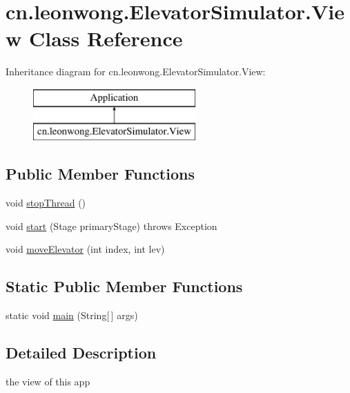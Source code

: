 \hypertarget{classcn_1_1leonwong_1_1_elevator_simulator_1_1_view}{}\section{cn.\+leonwong.\+Elevator\+Simulator.\+View Class Reference}
\label{classcn_1_1leonwong_1_1_elevator_simulator_1_1_view}
Inheritance diagram for cn.\+leonwong.\+Elevator\+Simulator.\+View\+:\begin{figure}[H]
\begin{center}
\leavevmode
\includegraphics[height=2.000000cm]{classcn_1_1leonwong_1_1_elevator_simulator_1_1_view}
\end{center}
\end{figure}
\subsection*{Public Member Functions}
\begin{DoxyCompactItemize}
\item 
void \hyperlink{classcn_1_1leonwong_1_1_elevator_simulator_1_1_view_a0cea78020cab972bf8370aff8bed9eea}{stop\+Thread} ()
\item 
void \hyperlink{classcn_1_1leonwong_1_1_elevator_simulator_1_1_view_a068904406a0d25168fedd721dee528ac}{start} (Stage primary\+Stage)  throws Exception
\item 
void \hyperlink{classcn_1_1leonwong_1_1_elevator_simulator_1_1_view_af6d3d9a99e60ae5cdcb26d16fe8f19b5}{move\+Elevator} (int index, int lev)
\end{DoxyCompactItemize}
\subsection*{Static Public Member Functions}
\begin{DoxyCompactItemize}
\item 
static void \hyperlink{classcn_1_1leonwong_1_1_elevator_simulator_1_1_view_a9b10d053813ba170b468ad402774bed9}{main} (String\mbox{[}$\,$\mbox{]} args)
\end{DoxyCompactItemize}


\subsection{Detailed Description}
the view of this app 

